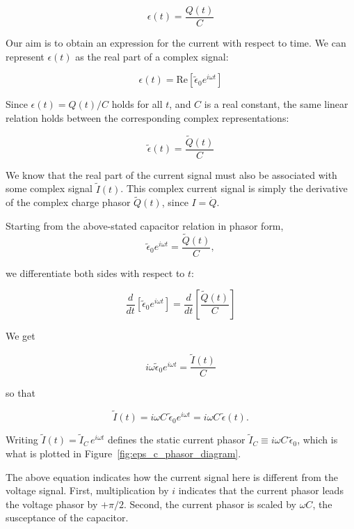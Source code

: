 \documentclass[11pt]{article}
\begin{document}
$$ \epsilon (t) = \frac{Q(t)}{C}$$

Our aim is to obtain an expression for the current with respect to time. We can represent $\epsilon(t)$ as the real part of a complex signal:

$$ \epsilon(t) = \text{Re}\left[\tilde{\epsilon}_0 e^{i \omega t}\right] $$

Since $\epsilon(t) = Q(t)/C$ holds for all $t$, and $C$ is a real constant, the same linear relation holds between the corresponding complex representations:

$$ \tilde{\epsilon}(t) = \frac{\tilde{Q}(t)}{C} $$

We know that the real part of the current signal must also be associated with some complex signal $\tilde{I}(t)$. This complex current signal is simply the derivative of the complex charge phasor $\tilde{Q}(t)$, since $I = \dot{Q}$.

Starting from the above-stated capacitor relation in phasor form,
$$ \tilde{\epsilon}_0 e^{i \omega t} = \frac{\tilde{Q}(t)}{C}, $$

we differentiate both sides with respect to $t$:

$$ \frac{d}{dt}\left[\tilde{\epsilon}_0 e^{i \omega t}\right] = \frac{d}{dt}\left[\frac{\tilde{Q}(t)}{C}\right] $$

We get

$$ i\omega \tilde{\epsilon}_0 e^{i \omega t} = \frac{\tilde{I}(t)}{C} $$

so that

$$ \tilde{I}(t) = i\omega C\, \tilde{\epsilon}_0 e^{i \omega t} = i \omega C\, \tilde{\epsilon}(t). $$

Writing $\tilde{I}(t) = \tilde{I}_C\, e^{i\omega t}$ defines the static current phasor $\tilde{I}_C \equiv i\omega C\, \tilde{\epsilon}_0$, which is what is plotted in Figure~\ref{fig:eps_c_phasor_diagram}.

The above equation indicates how the current signal here is different from the voltage signal. First, multiplication by $i$ indicates that the current phasor leads the voltage phasor by $+\pi/2$. Second, the current phasor is scaled by $\omega C$, the susceptance of the capacitor.
\end{document}
